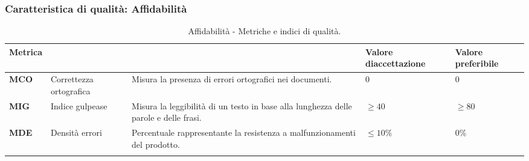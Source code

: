 \pagebreak

\subsubsection{Caratteristica di qualità: Affidabilità}
\begin{longtable}{|C{1.9cm}|L{4cm}|L{4cm}|L{2.2cm}|L{2.1cm}|}
    \hline
    \textbf{Metrica} &  &  & \textbf{Valore di\linebreak accettazione} & {\textbf{Valore \linebreak preferibile}} \\
    \hline \hline

    \textbf{MCO} & Correttezza ortografica & Misura la presenza di errori ortografici nei documenti. & $0$ & $0$ \\
    \hline

    \textbf{MIG} & Indice gulpease & Misura la leggibilità di un testo in base alla lunghezza delle parole e delle frasi. & $\geq 40$ & $\geq 80$ \\
    \hline

    \textbf{MDE} & Densità errori & Percentuale rappresentante la resistenza a malfunzionamenti del prodotto. & $\leq 10\%$ & $ 0\%$ \\
    \hline

    \caption{Affidabilità - Metriche e indici di qualità.}
    \label{tab:metriche_affidabilità_testo}
\end{longtable}

\vspace{0.5cm}

